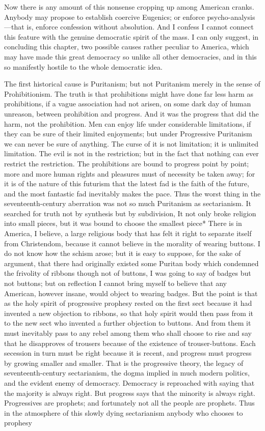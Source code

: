 \documentclass{book}
\begin{document}
Now there is any amount of this nonsense cropping up among American cranks. Anybody may propose to establish coercive Eugenics; or enforce psycho-analysis—that is, enforce confession without absolution. And I confess I cannot connect this feature with the genuine democratic spirit of the mass. I can only suggest, in concluding this chapter, two possible causes rather peculiar to America, which may have made this great democracy so unlike all other democracies, and in this so manifestly hostile to the whole democratic idea.

The first historical cause is Puritanism; but not Puritanism merely in the sense of Prohibitionism. The truth is that prohibitions might have done far less harm as prohibitions, if a vague association had not arisen, on some dark day of human unreason, between prohibition and progress. And it was the progress that did the harm, not the prohibition. Men can enjoy life under considerable limitations, if they can be sure of their limited enjoyments; but under Progressive Puritanism we can never be sure of anything. The curse of it is not limitation; it is unlimited limitation. The evil is not in the restriction; but in the fact that nothing can ever restrict the restriction. The prohibitions are bound to progress point by point; more and more human rights and pleasures must of necessity be taken away; for it is of the nature of this futurism that the latest fad is the faith of the future, and the most fantastic fad inevitably makes the pace. Thus the worst thing in the seventeenth-century aberration was not so much Puritanism as sectarianism. It searched for truth not by synthesis but by subdivision, It not only broke religion into small pieces, but it was bound to choose the smallest piece* There is in America, I believe, a large religious body that has felt it right to separate itself from Christendom, because it cannot believe in the morality of wearing buttons. I do not know how the schism arose; but it is easy to suppose, for the sake of argument, that there had originally existed some Puritan body which condemned the frivolity of ribbons though not of buttons, I was going to say of badges but not buttons; but on reflection I cannot bring myself to believe that any American, however insane, would object to wearing badges. But the point is that as the holy spirit of progressive prophesy rested on the first sect because it had invented a new objection to ribbons, so that holy spirit would then pass from it to the new sect who invented a further objection to buttons. And from them it must inevitably pass to any rebel among them who shall choose to rise and say that he disapproves of trousers because of the existence of trouser-buttons. Each secession in turn must be right because it is recent, and progress must progress by growing smaller and smaller. That is the progressive theory, the legacy of seventeenth-century sectarianism, the dogma implied in much modern politics, and the evident enemy of democracy. Democracy is reproached with saying that the majority is always right. But progress says that the minority is always right. Progressives are prophets; and fortunately not all the people are prophets. Thus in the atmosphere of this slowly dying sectarianism anybody who chooses to prophesy 
\end{document}
